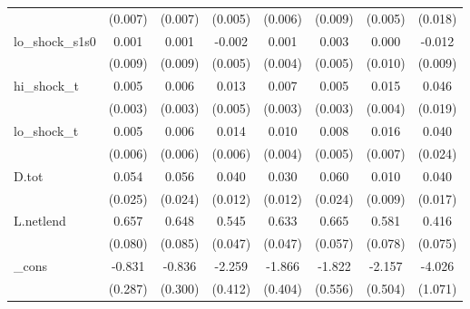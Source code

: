 {\begin{tabular}{l*{7}{c}}
            &     (0.007)         &     (0.007)         &     (0.005)         &     (0.006)         &     (0.009)         &     (0.005)         &     (0.018)         \\
\addlinespace
lo\_shock\_s1s0&       0.001         &       0.001         &      -0.002         &       0.001         &       0.003         &       0.000         &      -0.012         \\
            &     (0.009)         &     (0.009)         &     (0.005)         &     (0.004)         &     (0.005)         &     (0.010)         &     (0.009)         \\
\addlinespace
hi\_shock\_t  &       0.005\sym{*}  &       0.006\sym{*}  &       0.013\sym{***}&       0.007\sym{**} &       0.005         &       0.015\sym{***}&       0.046\sym{**} \\
            &     (0.003)         &     (0.003)         &     (0.005)         &     (0.003)         &     (0.003)         &     (0.004)         &     (0.019)         \\
\addlinespace
lo\_shock\_t  &       0.005         &       0.006         &       0.014\sym{**} &       0.010\sym{**} &       0.008         &       0.016\sym{**} &       0.040         \\
            &     (0.006)         &     (0.006)         &     (0.006)         &     (0.004)         &     (0.005)         &     (0.007)         &     (0.024)         \\
\addlinespace
D.tot       &       0.054\sym{**} &       0.056\sym{**} &       0.040\sym{***}&       0.030\sym{**} &       0.060\sym{**} &       0.010         &       0.040\sym{**} \\
            &     (0.025)         &     (0.024)         &     (0.012)         &     (0.012)         &     (0.024)         &     (0.009)         &     (0.017)         \\
\addlinespace
L.netlend   &       0.657\sym{***}&       0.648\sym{***}&       0.545\sym{***}&       0.633\sym{***}&       0.665\sym{***}&       0.581\sym{***}&       0.416\sym{***}\\
            &     (0.080)         &     (0.085)         &     (0.047)         &     (0.047)         &     (0.057)         &     (0.078)         &     (0.075)         \\
\addlinespace
\_cons      &      -0.831\sym{***}&      -0.836\sym{**} &      -2.259\sym{***}&      -1.866\sym{***}&      -1.822\sym{***}&      -2.157\sym{***}&      -4.026\sym{***}\\
            &     (0.287)         &     (0.300)         &     (0.412)         &     (0.404)         &     (0.556)         &     (0.504)         &     (1.071)         \\

\end{tabular}}
